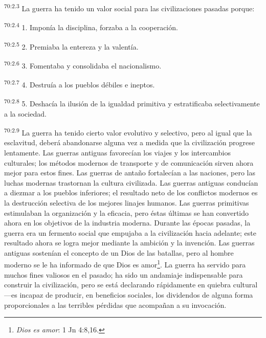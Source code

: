 \documentclass[twoside, 11pt]{book}
\begin{document}
\par
\textsuperscript{70:2.3} La guerra ha tenido un valor social para las civilizaciones pasadas porque:

\par
\textsuperscript{70:2.4} 1. Imponía la disciplina, forzaba a la cooperación.

\par
\textsuperscript{70:2.5} 2. Premiaba la entereza y la valentía.

\par
\textsuperscript{70:2.6} 3. Fomentaba y consolidaba el nacionalismo.

\par
\textsuperscript{70:2.7} 4. Destruía a los pueblos débiles e ineptos.

\par
\textsuperscript{70:2.8} 5. Deshacía la ilusión de la igualdad primitiva y estratificaba selectivamente a la sociedad.

\par
\textsuperscript{70:2.9} La guerra ha tenido cierto valor evolutivo y selectivo, pero al igual que la esclavitud, deberá abandonarse alguna vez a medida que la civilización progrese lentamente. Las guerras antiguas favorecían los viajes y los intercambios culturales; los métodos modernos de transporte y de comunicación sirven ahora mejor para estos fines. Las guerras de antaño fortalecían a las naciones, pero las luchas modernas trastornan la cultura civilizada. Las guerras antiguas conducían a diezmar a los pueblos inferiores; el resultado neto de los conflictos modernos es la destrucción selectiva de los mejores linajes humanos. Las guerras primitivas estimulaban la organización y la eficacia, pero éstas últimas se han convertido ahora en los objetivos de la industria moderna. Durante las épocas pasadas, la guerra era un fermento social que empujaba a la civilización hacia adelante; este resultado ahora se logra mejor mediante la ambición y la invención. Las guerras antiguas sostenían el concepto de un Dios de las batallas, pero al hombre moderno se le ha informado de que Dios es amor\footnote{\textit{Dios es amor}: 1 Jn 4:8,16.}. La guerra ha servido para muchos fines valiosos en el pasado; ha sido un andamiaje indispensable para construir la civilización, pero se está declarando rápidamente en quiebra cultural ---es incapaz de producir, en beneficios sociales, los dividendos de alguna forma proporcionales a las terribles pérdidas que acompañan a su invocación.
\end{document}
